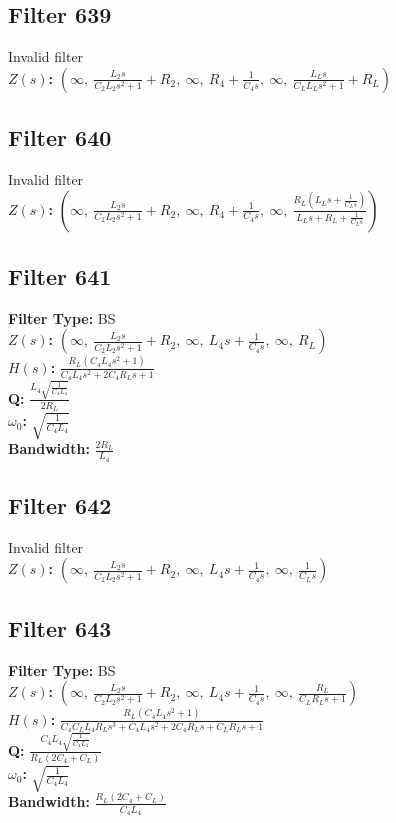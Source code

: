 \documentclass{article}
\begin{document}
\subsection*{Filter 639}
Invalid filter \\ 
\textbf{$Z(s)$:} $\left( \infty, \  \frac{L_{2} s}{C_{2} L_{2} s^{2} + 1} + R_{2}, \  \infty, \  R_{4} + \frac{1}{C_{4} s}, \  \infty, \  \frac{L_{L} s}{C_{L} L_{L} s^{2} + 1} + R_{L}\right)$ \\ 
\subsection*{Filter 640}
Invalid filter \\ 
\textbf{$Z(s)$:} $\left( \infty, \  \frac{L_{2} s}{C_{2} L_{2} s^{2} + 1} + R_{2}, \  \infty, \  R_{4} + \frac{1}{C_{4} s}, \  \infty, \  \frac{R_{L} \left(L_{L} s + \frac{1}{C_{L} s}\right)}{L_{L} s + R_{L} + \frac{1}{C_{L} s}}\right)$ \\ 
\subsection*{Filter 641}
\textbf{Filter Type:} BS \\ 
\textbf{$Z(s)$:} $\left( \infty, \  \frac{L_{2} s}{C_{2} L_{2} s^{2} + 1} + R_{2}, \  \infty, \  L_{4} s + \frac{1}{C_{4} s}, \  \infty, \  R_{L}\right)$ \\ 
\textbf{$H(s)$:} $\frac{R_{L} \left(C_{4} L_{4} s^{2} + 1\right)}{C_{4} L_{4} s^{2} + 2 C_{4} R_{L} s + 1}$ \\ 
\textbf{Q:} $\frac{L_{4} \sqrt{\frac{1}{C_{4} L_{4}}}}{2 R_{L}}$ \\ 
\textbf{$\omega_0$:} $\sqrt{\frac{1}{C_{4} L_{4}}}$ \\ 
\textbf{Bandwidth:} $\frac{2 R_{L}}{L_{4}}$ \\ 
\subsection*{Filter 642}
Invalid filter \\ 
\textbf{$Z(s)$:} $\left( \infty, \  \frac{L_{2} s}{C_{2} L_{2} s^{2} + 1} + R_{2}, \  \infty, \  L_{4} s + \frac{1}{C_{4} s}, \  \infty, \  \frac{1}{C_{L} s}\right)$ \\ 
\subsection*{Filter 643}
\textbf{Filter Type:} BS \\ 
\textbf{$Z(s)$:} $\left( \infty, \  \frac{L_{2} s}{C_{2} L_{2} s^{2} + 1} + R_{2}, \  \infty, \  L_{4} s + \frac{1}{C_{4} s}, \  \infty, \  \frac{R_{L}}{C_{L} R_{L} s + 1}\right)$ \\ 
\textbf{$H(s)$:} $\frac{R_{L} \left(C_{4} L_{4} s^{2} + 1\right)}{C_{4} C_{L} L_{4} R_{L} s^{3} + C_{4} L_{4} s^{2} + 2 C_{4} R_{L} s + C_{L} R_{L} s + 1}$ \\ 
\textbf{Q:} $\frac{C_{4} L_{4} \sqrt{\frac{1}{C_{4} L_{4}}}}{R_{L} \left(2 C_{4} + C_{L}\right)}$ \\ 
\textbf{$\omega_0$:} $\sqrt{\frac{1}{C_{4} L_{4}}}$ \\ 
\textbf{Bandwidth:} $\frac{R_{L} \left(2 C_{4} + C_{L}\right)}{C_{4} L_{4}}$ \\ 
\end{document}
